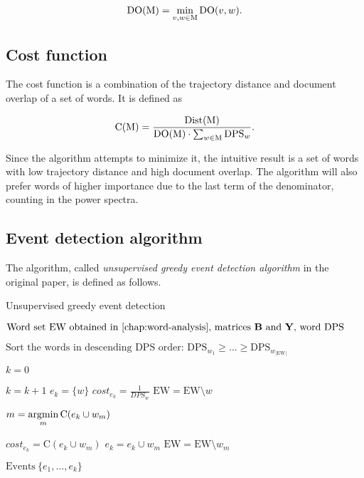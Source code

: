 \begin{equation} \label{eq:document-overlap}
	\text{DO}( \text{M} ) = \min_{v, w \in \text{M}} \text{DO}( v, w ).
\end{equation}

\subsection{Cost function}
The cost function is a combination of the trajectory distance and document overlap of a set of words. It is defined as

\begin{equation} \label{eq:cost-function-original}
	\text{C}( \text{M} ) = \frac{\text{Dist}( \text{M} )}{\text{DO}( \text{M} ) \cdot \sum_{w \in \text{M}} \text{DPS}_{w}}.
\end{equation}

Since the algorithm attempts to minimize it, the intuitive result is a set of words with low trajectory distance and high document overlap. The algorithm will also prefer words of higher importance due to the last term of the denominator, counting in the power spectra.


\subsection{Event detection algorithm}
The algorithm, called \textit{unsupervised greedy event detection algorithm} in the original paper, is defined as follows.

\begin{algorithm}[H]
\begin{algorithmic}[1]
\caption{Unsupervised greedy event detection}
\label{alg:greedy-event-detection}
\Input $\text{Word set} ~ \text{EW obtained in \autoref{chap:word-analysis}, matrices } \bowmat \text{ and }\trajmat \text{, word DPS}$

\State $\text{Sort the words in descending DPS order: } \text{DPS}_{w_{1}} \geq \dots \geq \text{DPS}_{w_{\left\vert \text{EW} \right\vert}}$

\State $k = 0$

	\State $k = k + 1$	
	\State $e_{k} = \{ w \}$
	\State $cost_{e_{k}} = \frac{1}{DPS_{w}}$
	\State $\text{EW} = \text{EW} \setminus w$
	
		\State $m = \operatorname*{argmin}\limits_{m}{\text{C}( e_{k} \cup w_{m} )}$

			\State $cost_{e_{k}} = \text{C}( e_{k} \cup w_{m} )$
			\State $e_{k} = e_{k} \cup w_{m}$
			\State $\text{EW} = \text{EW} \setminus w_{m}$
		\Else
			\Break
		\EndIf
	\EndWhile
\EndFor

\Output $\text{Events} ~ \{ e_{1}, \dots, e_{k} \}$
\end{algorithmic}
\end{algorithm}

